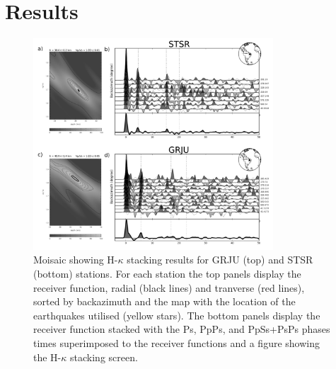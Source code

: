 \documentclass[paper,11pt]{geophysics}
\begin{document}
\section{Results}

\begin{figure}[!ht]
\centering
\includegraphics[width=0.8\textwidth]{Fig/mosaico_GRJU_STSR.png}
\caption{Moisaic showing H-$\kappa$ stacking results for GRJU (top) and STSR (bottom) stations. For each station the top panels display the receiver function, radial (black lines) and tranverse (red lines), sorted by backazimuth and the map with the location of the earthquakes utilised (yellow stars). The bottom panels display the receiver function stacked with the Ps, PpPs, and PpSs+PsPs phases times superimposed to the receiver functions and a figure showing the H-$\kappa$ stacking screen.}
\label{moisaic_FR}
\end{figure}
\end{document}

